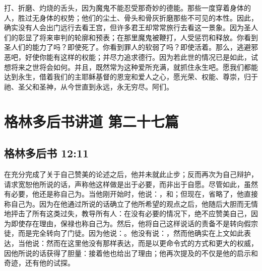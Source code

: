打、折磨、灼烧的舌头，因为魔鬼不能忍受那奇妙的德能。那些一度穿着身体的人，胜过无身体的权势；他们的尘土、骨头和骨灰折磨那些不可见的本性。因此，确实没有人会出门远行去看王宫，但许多君王却常常旅行去看这一景象。因为圣人们的彰显了将来审判的轮廓和预表；在那里魔鬼被鞭打，人受惩罚和释放。你看到圣人们的能力了吗？即使死了。你看到罪人的软弱了吗？即使活着。那么，逃避邪恶吧，好使你能有这样的权能；并尽力追求德行。因为若此世的情况已是如此，试想将来之世将会如何。并且，既然常为这种爱所充满，就抓住永生吧。愿我们都能达到永生，借着我们的主耶稣基督的恩宠和爱人之心，愿光荣、权能、尊崇，归于祂、圣父和圣神，从今世直到永远，永无穷尽。阿们。\par



\section{格林多后书讲道 第二十七篇}


\subsection{格林多后书 12:11}

\par

在充分完成了关于自己赞美的论述之后，他并未就此止步；反而再次为自己辩护，请求宽恕他所说的话，声称他这样做是出于必要，而非出于自愿。尽管如此，虽然有必要，他还是称自己为。当他刚开始时，他说：，和；但现在，省略了，他直接称自己为。因为在他通过所说的话确立了他所希望的观点之后，他随后大胆而无情地抨击了所有这类过失，教导所有人：在没有必要的情况下，绝不应赞美自己，因为即使存在理由，保禄也称自己为。然后，他将自己这样说话的责备不是转向假宗徒，而是完全转向了门徒。因为他说：。他没有说：，然而他确实在上文如此表达，当他说：然而在这里他没有那样表达，而是以更命令式的方式和更大的权威，因他所说的话获得了胆量：接着他也给出了理由；他再次提及的不仅是他的启示和奇迹，还有他的试探。\par

